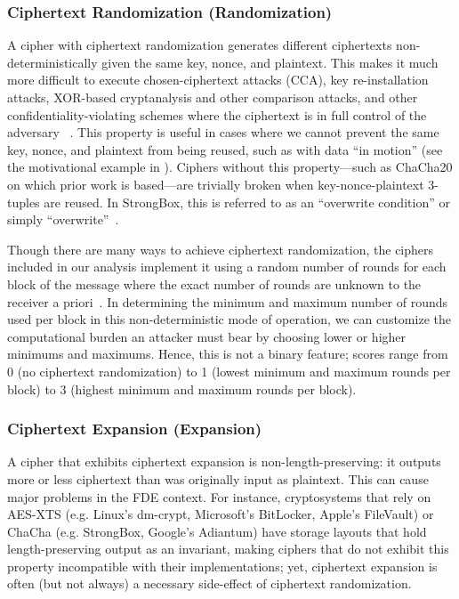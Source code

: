 \subsubsection{Ciphertext Randomization (Randomization)}

A cipher with ciphertext randomization generates different ciphertexts
non-deterministically given the same key, nonce, and plaintext. This makes it
much more difficult to execute chosen-ciphertext attacks (CCA), key
re-installation attacks, XOR-based cryptanalysis and other comparison attacks,
and other confidentiality-violating schemes where the ciphertext is in full
control of the adversary ~\cite{Freestyle}. This property is useful in cases
where we cannot prevent the same key, nonce, and plaintext from being reused,
such as with data ``in motion'' (see the motivational example in
). Ciphers without this property---such as ChaCha20 on which
prior work is based---are trivially broken when key-nonce-plaintext 3-tuples are
reused. In StrongBox, this is referred to as an ``overwrite condition'' or
simply ``overwrite''~\cite{StrongBox}.

Though there are many ways to achieve ciphertext randomization, the ciphers
included in our analysis implement it using a random number of rounds for each
block of the message where the exact number of rounds are unknown to the
receiver a priori~\cite{Freestyle}. In determining the minimum and maximum
number of rounds used per block in this non-deterministic mode of operation, we
can customize the computational burden an attacker must bear by choosing lower
or higher minimums and maximums. Hence, this is not a binary feature; scores
range from 0 (no ciphertext randomization) to 1 (lowest minimum and maximum
rounds per block) to 3 (highest minimum and maximum rounds per block).

\subsubsection{Ciphertext Expansion (Expansion)}

A cipher that exhibits ciphertext expansion is non-length-preserving: it outputs
more or less ciphertext than was originally input as plaintext. This can cause
major problems in the FDE context. For instance, cryptosystems that rely on
AES-XTS (e.g. Linux's dm-crypt, Microsoft's BitLocker, Apple's FileVault) or
ChaCha (e.g. StrongBox, Google's Adiantum) have storage layouts that hold
length-preserving output as an invariant, making ciphers that do not exhibit
this property incompatible with their implementations; yet, ciphertext expansion
is often (but not always) a necessary side-effect of ciphertext randomization.

